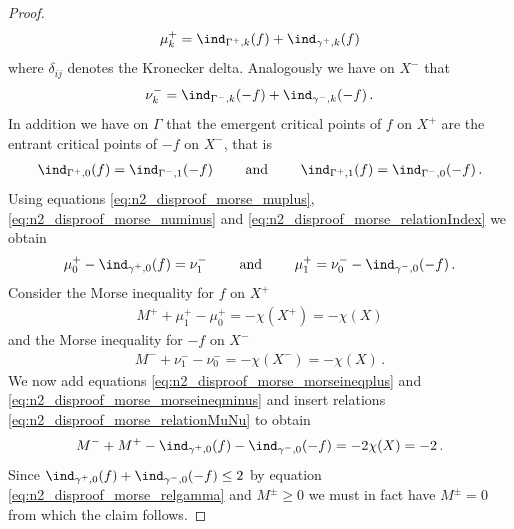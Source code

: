 \begin{proof}
  \begin{align}
    \mu^+_k=\ind_{\Gamma^+,k}(f)+\ind_{\gamma^+,k}(f)\label{eq:n2_disproof_morse_muplus}
  \end{align}
  where $\delta_{ij}$ denotes the Kronecker delta.
  Analogously we have on $X^-$ that
  \begin{align}
    \nu^-_k=\ind_{\Gamma^-,k}(-f)+\ind_{\gamma^-,k}(-f)\,.\label{eq:n2_disproof_morse_numinus}
  \end{align}
  In addition we have on $\Gamma$ that the emergent critical points of $f$ on $X^+$ are the
  entrant critical points of $-f$ on $X^-$, that is
  \begin{align}
    \ind_{\Gamma^+,0}(f)=\ind_{\Gamma^-,1}(-f)\qquad\text{ and }\qquad 
    \ind_{\Gamma^+,1}(f)=\ind_{\Gamma^-,0}(-f)\,.\label{eq:n2_disproof_morse_relationIndex} 
  \end{align}
  Using equations \eqref{eq:n2_disproof_morse_muplus}, \eqref{eq:n2_disproof_morse_numinus} and \eqref{eq:n2_disproof_morse_relationIndex}
  we obtain
  \begin{align}
    \mu^+_0-\ind_{\gamma^+,0}(f)=\nu^-_1 \qquad\text{ and }\qquad
    \mu^+_1=\nu^-_0-\ind_{\gamma^-,0}(-f)\,.\label{eq:n2_disproof_morse_relationMuNu}
  \end{align}
  Consider the Morse inequality for $f$ on $X^+$
  \begin{align}
    M^++\mu^+_1-\mu^+_0=-\chi(X^+)=-\chi(X)\label{eq:n2_disproof_morse_morseineqplus}
  \end{align}
  and the Morse inequality for $-f$ on $X^-$
  \begin{align}
    M^-+\nu^-_1-\nu^-_0=-\chi(X^-)=-\chi(X)\,.\label{eq:n2_disproof_morse_morseineqminus}
  \end{align}
  We now add equations \eqref{eq:n2_disproof_morse_morseineqplus} and \eqref{eq:n2_disproof_morse_morseineqminus}
  and insert relations \eqref{eq:n2_disproof_morse_relationMuNu} to obtain
  \begin{align*}
    M^-+M^+-\ind_{\gamma^+,0}(f)-\ind_{\gamma^-,0}(-f)=-2\chi(X)=-2\,.
  \end{align*}
  Since $\ind_{\gamma^+,0}(f)+\ind_{\gamma^-,0}(-f)\leq2$ by equation \eqref{eq:n2_disproof_morse_relgamma} and $M^\pm\geq0$ we must in fact have $M^\pm=0$ from which the claim follows.



\end{proof}
